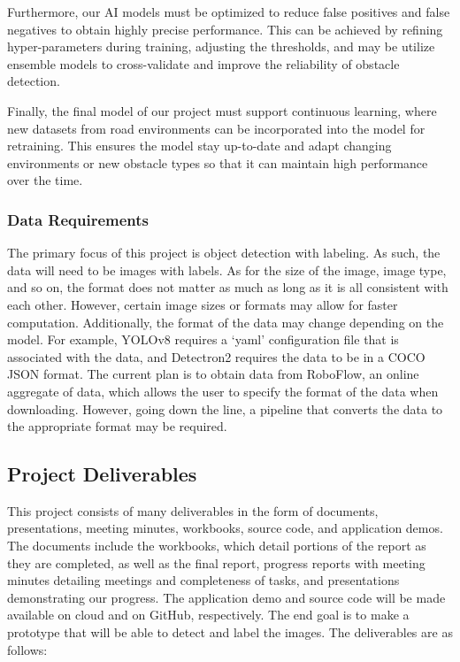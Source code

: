 \documentclass[stu,12pt,floatsintext]{apa7}
\begin{document}
Furthermore, our AI models must be optimized to reduce false positives and false negatives to obtain highly precise performance. This can be achieved by refining hyper-parameters during training, adjusting the thresholds, and may be utilize ensemble models to cross-validate and improve the reliability of obstacle detection. 

Finally, the final model of our project must support continuous learning, where new datasets from road environments can be incorporated into the model for retraining. This ensures the model stay up-to-date and adapt changing environments or new obstacle types so that it can maintain high performance over the time. 

\subsubsection{Data Requirements}
The primary focus of this project is object detection with labeling. As such, the data will need to be images with labels. As for the size of the image, image type, and so on, the format does not matter as much as long as it is all consistent with each other. However, certain image sizes or formats may allow for faster computation. Additionally, the format of the data may change depending on the model. For example, YOLOv8 requires a `yaml' configuration file that is associated with the data, and Detectron2 requires the data to be in a COCO JSON format. The current plan is to obtain data from RoboFlow, an online aggregate of data, which allows the user to specify the format of the data when downloading. However, going down the line, a pipeline that converts the data to the appropriate format may be required.

\subsection{Project Deliverables}
This project consists of many deliverables in the form of documents, presentations, meeting minutes, workbooks, source code, and application demos. The documents include the workbooks, which detail portions of the report as they are completed, as well as the final report, progress reports with meeting minutes detailing meetings and completeness of tasks, and presentations demonstrating our progress. The application demo and source code will be made available on cloud and on GitHub, respectively. The end goal is to make a prototype that will be able to detect and label the images.
The deliverables are as follows:
\end{document}
